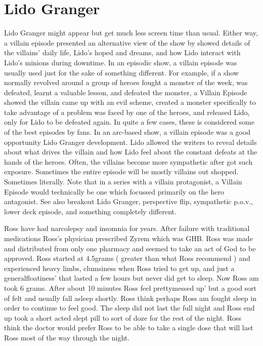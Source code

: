 \documentclass[12pt]{book}
\author{collective consciousness fiction generator\\http://rossgoodwin.com/ficgen}
\date{\today}
\begin{document}
\maketitle



\chapter{Lido Granger}

Lido Granger might appear but get much less screen time than usual. Either way, a villain episode presented an alternative view of the show by showed details of the villains' daily life, Lido's hoped and dreams, and how Lido interact with Lido's minions during downtime. In an episodic show, a villain episode was usually used just for the sake of something different. For example, if a show normally revolved around a group of heroes fought a monster of the week, was defeated, learnt a valuable lesson, and defeated the monster, a Villain Episode showed the villain came up with an evil scheme, created a monster specifically to take advantage of a problem was faced by one of the heroes, and released Lido, only for Lido to be defeated again. In quite a few cases, these is considered some of the best episodes by fans. In an arc-based show, a villain episode was a good opportunity Lido Granger development. Lido allowed the writers to reveal details about what drives the villain and how Lido feel about the constant defeats at the hands of the heroes. Often, the villains become more sympathetic after got such exposure. Sometimes the entire episode will be mostly villains out shopped. Sometimes literally. Note that in a series with a villain protagonist, a Villain Episode would technically be one which focussed primarily on the hero antagonist. See also breakout Lido Granger, perspective flip, sympathetic p.o.v., lower deck episode, and something completely different.



Ross have had narcolepsy and insomnia for years. After failure with traditional medications Ross's physician prescribed Zyrem which was GHB. Ross was made and distributed from only one pharmacy and seemed to take an act of God to be approved. Ross started at 4.5grams ( greater than what Ross recommend ) and experienced heavy limbs, clumsiness when Ross tried to get up, and just a generalfloatiness' that lasted a few hours but never did get to sleep. Now Ross am took 6 grams. After about 10 minutes Ross feel prettymessed up' but a good sort of felt and usually fall asleep shortly. Ross think perhaps Ross am fought sleep in order to continue to feel good. The sleep did not last the full night and Ross end up took a short acted slept pill to sort of doze for the rest of the night. Ross think the doctor would prefer Ross to be able to take a single dose that will last Ross most of the way through the night.
\end{document}
